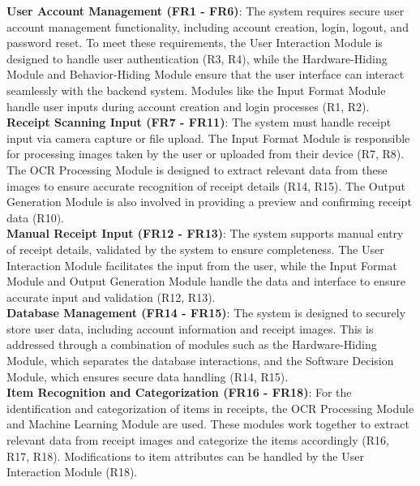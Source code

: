 \documentclass[12pt, titlepage]{article}
\begin{document}
\noindent \textbf{User Account Management (FR1 - FR6)}:  
The system requires secure user account management functionality, including account creation, login, logout, and password reset. To meet these requirements, the User Interaction Module is designed to handle user authentication (R3, R4), while the Hardware-Hiding Module and Behavior-Hiding Module ensure that the user interface can interact seamlessly with the backend system. Modules like the Input Format Module handle user inputs during account creation and login processes (R1, R2). \\

\noindent \textbf{Receipt Scanning Input (FR7 - FR11)}:  
The system must handle receipt input via camera capture or file upload. The Input Format Module is responsible for processing images taken by the user or uploaded from their device (R7, R8). The OCR Processing Module is designed to extract relevant data from these images to ensure accurate recognition of receipt details (R14, R15). The Output Generation Module is also involved in providing a preview and confirming receipt data (R10). \\

\noindent \textbf{Manual Receipt Input (FR12 - FR13)}:  
The system supports manual entry of receipt details, validated by the system to ensure completeness. The User Interaction Module facilitates the input from the user, while the Input Format Module and Output Generation Module handle the data and interface to ensure accurate input and validation (R12, R13). \\

\noindent \textbf{Database Management (FR14 - FR15)}:  
The system is designed to securely store user data, including account information and receipt images. This is addressed through a combination of modules such as the Hardware-Hiding Module, which separates the database interactions, and the Software Decision Module, which ensures secure data handling (R14, R15). \\

\noindent \textbf{Item Recognition and Categorization (FR16 - FR18)}:  
For the identification and categorization of items in receipts, the OCR Processing Module and Machine Learning Module are used. These modules work together to extract relevant data from receipt images and categorize the items accordingly (R16, R17, R18). Modifications to item attributes can be handled by the User Interaction Module (R18). \\
\end{document}
